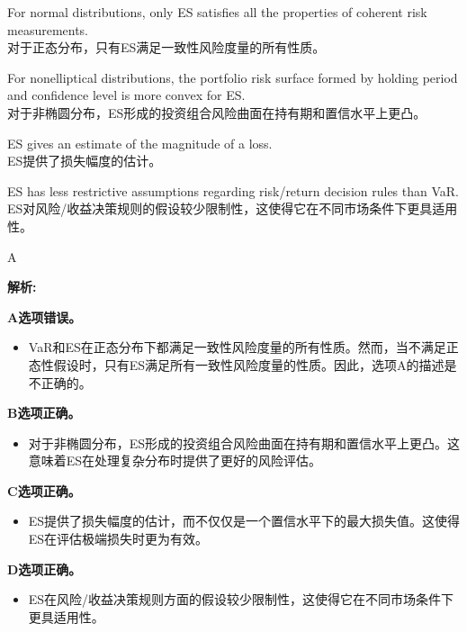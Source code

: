 \documentclass{article}
\newenvironment{explanation}
{\textbf{解析:}\par}
{\par}
\begin{document}
    \begin{choices}
        \item For normal distributions, only ES satisfies all the properties of coherent risk measurements.\\
        对于正态分布，只有ES满足一致性风险度量的所有性质。
        \item For nonelliptical distributions, the portfolio risk surface formed by holding period and confidence level is more convex for ES.\\
        对于非椭圆分布，ES形成的投资组合风险曲面在持有期和置信水平上更凸。
        \item ES gives an estimate of the magnitude of a loss.\\
        ES提供了损失幅度的估计。
        \item ES has less restrictive assumptions regarding risk/return decision rules than VaR.\\
        ES对风险/收益决策规则的假设较少限制性，这使得它在不同市场条件下更具适用性。
    \end{choices}
    
    \begin{correctanswer}
        A
    \end{correctanswer}
    
    \begin{explanation}
        \textbf{A选项错误。}
        \begin{itemize}
            \item VaR和ES在正态分布下都满足一致性风险度量的所有性质。然而，当不满足正态性假设时，只有ES满足所有一致性风险度量的性质。因此，选项A的描述是不正确的。
        \end{itemize}
    
        \textbf{B选项正确。}
        \begin{itemize}
            \item 对于非椭圆分布，ES形成的投资组合风险曲面在持有期和置信水平上更凸。这意味着ES在处理复杂分布时提供了更好的风险评估。
        \end{itemize}
    
        \textbf{C选项正确。}
        \begin{itemize}
            \item ES提供了损失幅度的估计，而不仅仅是一个置信水平下的最大损失值。这使得ES在评估极端损失时更为有效。
        \end{itemize}
    
        \textbf{D选项正确。}
        \begin{itemize}
            \item ES在风险/收益决策规则方面的假设较少限制性，这使得它在不同市场条件下更具适用性。
        \end{itemize}
    \end{explanation}
\end{document}
